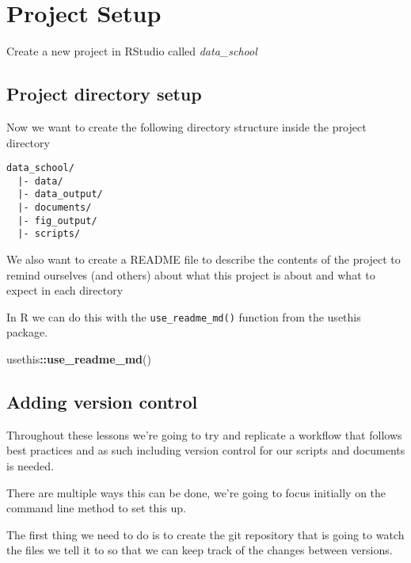 \documentclass[]{book}
\newenvironment{Shaded}{\begin{snugshade}}{\end{snugshade}}
\newcommand{\KeywordTok}[1]{\textcolor[rgb]{0.13,0.29,0.53}{\textbf{#1}}}
\newcommand{\NormalTok}[1]{#1}
\newcommand{\OperatorTok}[1]{\textcolor[rgb]{0.81,0.36,0.00}{\textbf{#1}}}
\begin{document}
\hypertarget{project-setup}{%
\section{Project Setup}\label{project-setup}}

Create a new project in RStudio called \emph{data\_school}

\hypertarget{project-directory-setup}{%
\subsection{Project directory setup}\label{project-directory-setup}}

Now we want to create the following directory structure inside the
project directory

\begin{verbatim}
data_school/
  |- data/
  |- data_output/
  |- documents/
  |- fig_output/
  |- scripts/
\end{verbatim}

We also want to create a README file to describe the contents of the
project to remind ourselves (and others) about what this project is
about and what to expect in each directory

In R we can do this with the \texttt{use\_readme\_md()} function from
the usethis package.

\begin{Shaded}
\begin{Highlighting}[]
\NormalTok{usethis}\OperatorTok{::}\KeywordTok{use_readme_md}\NormalTok{()}
\end{Highlighting}
\end{Shaded}

\hypertarget{adding-version-control}{%
\subsection{Adding version control}\label{adding-version-control}}

Throughout these lessons we're going to try and replicate a workflow
that follows best practices and as such including version control for
our scripts and documents is needed.

There are multiple ways this can be done, we're going to focus initially
on the command line method to set this up.

The first thing we need to do is to create the git repository that is
going to watch the files we tell it to so that we can keep track of the
changes between versions.
\end{document}
